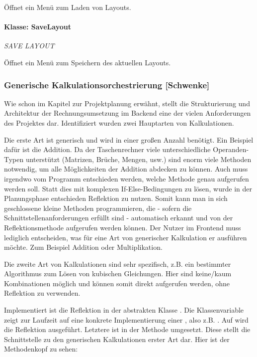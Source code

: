 Öffnet ein Menü zum Laden von Layouts.
\paragraph{Klasse: SaveLayout}
\textit{SAVE LAYOUT}

Öffnet ein Menü zum Speichern des aktuellen Layouts.


\subsubsection{Generische Kalkulationsorchestrierung [Schwenke]}

Wie schon im Kapitel zur Projektplanung erwähnt, stellt die Strukturierung und Architektur der Rechnungsumsetzung im Backend eine der vielen Anforderungen des Projektes dar. Identifiziert wurden zwei Hauptarten von Kalkulationen. 

Die erste Art ist generisch und wird in einer großen Anzahl benötigt. Ein Beispiel dafür ist die Addition. Da der Taschenrechner viele unterschiedliche Operanden-Typen unterstützt (Matrizen, Brüche, Mengen, usw.) sind enorm viele Methoden notwendig, um alle Möglichkeiten der Addition abdecken zu können. Auch muss irgendwo vom Programm entschieden werden, welche Methode genau aufgerufen werden soll. Statt dies mit komplexen If-Else-Bedingungen zu lösen, wurde in der Planungsphase entschieden Reflektion zu nutzen. Somit kann man in sich geschlossene kleine Methoden programmieren, die - sofern die Schnittstellenanforderungen erfüllt sind - automatisch erkannt und von der Reflektionsmethode aufgerufen werden können. Der Nutzer im Frontend muss lediglich entscheiden, was für eine Art von generischer Kalkulation er ausführen möchte. Zum Beispiel Addition oder Multiplikation. 

Die zweite Art von Kalkulationen sind sehr spezifisch, z.B. ein bestimmter Algorithmus zum Lösen von kubischen Gleichungen. Hier sind keine/kaum Kombinationen möglich und können somit direkt aufgerufen werden, ohne Reflektion zu verwenden.

Implementiert ist die Reflektion in der abstrakten Klasse . Die Klassenvariable  zeigt zur Laufzeit auf eine konkrete Implementierung einer , also z.B. . Auf  wird die Reflektion ausgeführt. Letztere ist in der Methode  umgesetzt. Diese stellt die Schnittstelle zu den generischen Kalkulationen erster Art dar. Hier ist der Methodenkopf zu sehen:

